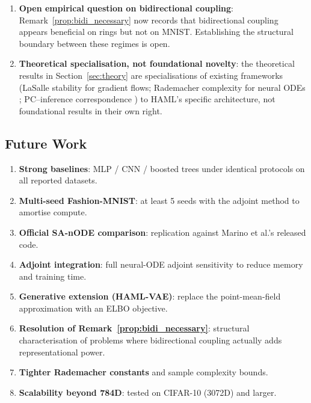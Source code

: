 \documentclass[11pt,a4paper]{article}
\begin{document}
\begin{enumerate}
        explanation.
  \item \textbf{Open empirical question on bidirectional coupling}:
        Remark~\ref{prop:bidi_necessary} now records that bidirectional coupling
        appears beneficial on rings but not on MNIST. Establishing the structural
        boundary between these regimes is open.
  \item \textbf{Theoretical specialisation, not foundational novelty}: the theoretical
        results in Section~\ref{sec:theory} are specialisations of existing frameworks
        (LaSalle stability for gradient flows; Rademacher complexity for neural ODEs
        \cite{hanson2024rademacher,marion2023generalization}; PC--inference
        correspondence \cite{whittington2017approximation,song2020can,salvatori2021exactbp})
        to HAML's specific architecture, not foundational results in their own right.
\end{enumerate}

\subsection{Future Work}
\label{sec:future}
\label{sec:future}

\begin{enumerate}
  \item \textbf{Strong baselines}: MLP / CNN / boosted trees under identical protocols on
        all reported datasets.
  \item \textbf{Multi-seed Fashion-MNIST}: at least 5 seeds with the adjoint method to
        amortise compute.
  \item \textbf{Official SA-nODE comparison}: replication against Marino et al.'s released
        code.
  \item \textbf{Adjoint integration}: full neural-ODE adjoint sensitivity to reduce
        memory and training time.
  \item \textbf{Generative extension (HAML-VAE)}: replace the point-mean-field
        approximation with an ELBO objective.
  \item \textbf{Resolution of Remark~\ref{prop:bidi_necessary}}: structural
        characterisation of problems where bidirectional coupling actually adds
        representational power.
  \item \textbf{Tighter Rademacher constants} and sample complexity bounds.
  \item \textbf{Scalability beyond 784D}: tested on CIFAR-10 (3072D) and larger.
\end{enumerate}
\end{document}
